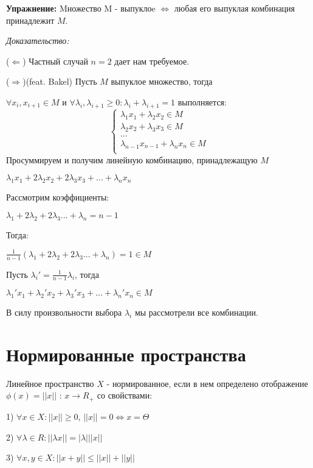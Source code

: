 \documentclass[12pt]{article}
\begin{document}
\textbf{Упражнение:}
	Mножество M - выпуклоe $\Leftrightarrow$ любая его выпуклая комбинация принадлежит $M$.
	
\textit{Доказательство:}
	
	($\Leftarrow$) Частный случай $n = 2$ дает нам требуемое.
	
	($\Rightarrow$)(feat. Bakel) Пусть $M$ выпуклое множество, тогда
	
	$\forall x_i, x_{i+1}\in M$ и $\forall \lambda_i , \lambda_{i+1} \ge 0 : \lambda_i + \lambda_{i+1} = 1$ выполняется:	
$$
\begin{cases}
  	\lambda_1 x_1 + \lambda_2 x_2 \in M \\
    \lambda_2 x_2 + \lambda_3 x_3 \in M \\ 
    ... \\
    \lambda_{n-1} x_{n-1} + \lambda_n x_n \in M \\ 
\end{cases}
$$	
Просуммируем и получим линейную комбинацию, принадлежащую $M$
	
	$\lambda_1 x_1 + 2\lambda_2 x_2 + 2\lambda_3 x_3 + ... + \lambda_n x_n$
	
	Рассмотрим коэффициенты:
	
	$\lambda_1  + 2\lambda_2 + 2\lambda_3 ...+  \lambda_n = n - 1$
	
	Тогда:
	
	$\frac{1}{n-1}(\lambda_1  + 2\lambda_2 + 2\lambda_3 ...+  \lambda_n) = 1 \in M$
	
	Пусть $\lambda_i' = \frac{1}{n-1}\lambda_i$, тогда
	
	$\lambda_1' x_1  + \lambda_2' x_2 + \lambda_3' x_3 + ...+  \lambda_n' x_n \in M$ 
	
	В силу произвольности выбора $\lambda_i$ мы рассмотрели все комбинации.
	
	
	
\newpage
\section{Нормированные пространства}
		Линейное пространство $X$ - нормированное, если в нем определено отображение $\phi(x) = ||x||$ : $ x \to R_+$ со свойствами:
		
		1) $\forall x \in X: ||x|| \ge 0$, $||x|| = 0 \Leftrightarrow x = \Theta$
		
		2) $\forall \lambda \in R:  || \lambda x || = |\lambda|||x||$
		
		3) $\forall x,y \in X : ||x + y || \leq ||x|| + ||y||$
	
\end{document}
